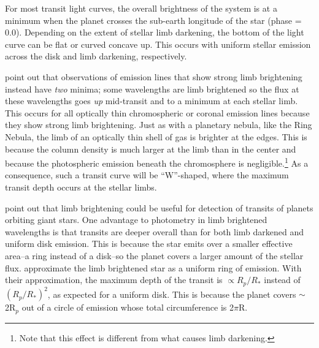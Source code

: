\documentclass[manuscript]{aastex}
\begin{document}
For most transit light curves, the overall brightness of the system is at a minimum when the planet crosses the sub-earth longitude of the star (phase = 0.0). Depending on the extent of stellar limb darkening, the bottom of the light curve can be flat or curved concave up. This occurs with uniform stellar emission across the disk and limb darkening, respectively.
%

\citet{assef} point out that observations of emission lines that show strong limb brightening instead have {\it two} minima; some
wavelengths are limb brightened so the flux at these wavelengths goes
{\it up} mid-transit and to a minimum at each stellar limb. This occurs for all optically thin
chromospheric or coronal emission lines because they show strong limb brightening. Just as with a planetary
nebula, like the Ring Nebula, the limb of an optically thin shell of
gas is brighter at the edges. This is because the column density is much larger at the limb than in the center and because the photospheric emission beneath the chromosphere is negligible.\footnote{Note
that this effect is different from what causes limb darkening.} As a
consequence, such a transit curve will be ``W''-shaped, where the maximum
transit depth occurs at the stellar limbs.

\citet{assef} point out that limb brightening could be
useful for detection of transits of planets orbiting giant stars. One advantage
to photometry in limb brightened wavelengths is that transits are
deeper overall than for both limb darkened and uniform disk
emission. This is because the star emits over a smaller effective area--a ring instead of a disk--so the planet covers a larger amount of the
stellar flux. \citet{assef} approximate the limb brightened
star as a uniform ring of emission. With their approximation, the maximum depth
of the transit is  $\propto R_p/R_*$ instead of $(R_p/R_*)^2$,
as expected for a uniform disk. This is because the planet covers $\sim$2R$_p$ out of a circle of emission whose total circumference is 2$\pi$R. 
\end{document}
